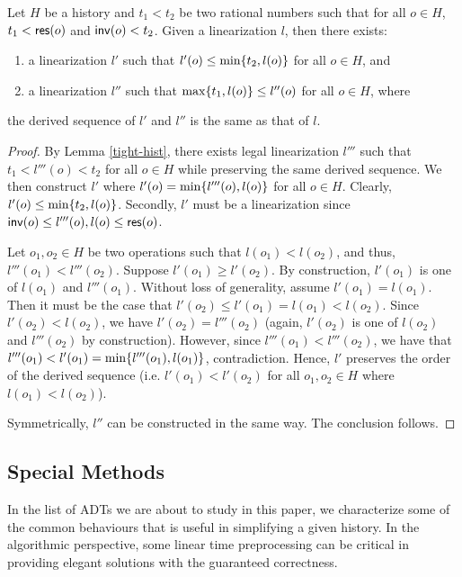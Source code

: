 \begin{lemma}\label{flush-hist}
    Let $H$ be a history and $t_1 < t_2$ be two rational numbers such that for all $o \in H$, $t_1 < {\sf res}(o)$ and ${\sf inv}(o) < t_2$. Given a linearization $l$, then there exists:
    \begin{enumerate}
        \item a linearization $l'$ such that $l'(o) \leq \min\{t_2, l(o)\}$ for all $o \in H$, and
        \item a linearization $l''$ such that $\max\{t_1, l(o)\} \leq l''(o)$ for all $o \in H$, where
    \end{enumerate}
    the derived sequence of $l'$ and $l''$ is the same as that of $l$.
\end{lemma}
\begin{proof}
    By Lemma \ref{tight-hist}, there exists legal linearization $l'''$ such that $t_1 < l'''(o) < t_2$ for all $o \in H$ while preserving the same derived sequence. We then construct $l'$ where $l'(o) = \min\{l'''(o), l(o)\}$ for all $o \in H$. Clearly, $l'(o) \leq \min\{t_2, l(o)\}$. Secondly, $l'$ must be a linearization since ${\sf inv}(o) \leq l'''(o), l(o) \leq {\sf res}(o)$.

Let $o_1, o_2 \in H$ be two operations such that $l(o_1) < l(o_2)$, and thus, $l'''(o_1) < l'''(o_2)$. Suppose $l'(o_1) \geq l'(o_2)$. By construction, $l'(o_1)$ is one of $l(o_1)$ and $l'''(o_1)$. Without loss of generality, assume $l'(o_1) = l(o_1)$. Then it must be the case that $l'(o_2) \leq l'(o_1) = l(o_1) < l(o_2)$. Since $l'(o_2) < l(o_2)$, we have $l'(o_2) = l'''(o_2)$ (again, $l'(o_2)$ is one of $l(o_2)$ and $l'''(o_2)$ by construction). However, since $l'''(o_1) < l'''(o_2)$, we have that $l'''(o_1) < l'(o_1) = \min\{l'''(o_1), l(o_1)\}$, contradiction. Hence, $l'$ preserves the order of the derived sequence (i.e. $l'(o_1) < l'(o_2)$ for all $o_1, o_2 \in H$ where $l(o_1) < l(o_2)$).

    Symmetrically, $l''$ can be constructed in the same way. The conclusion follows.
\end{proof}

\subsection{Special Methods}
In the list of ADTs we are about to study in this paper, we characterize some of the common behaviours that is useful in simplifying a given history. In the algorithmic perspective, some linear time preprocessing can be critical in providing elegant solutions with the guaranteed correctness.

